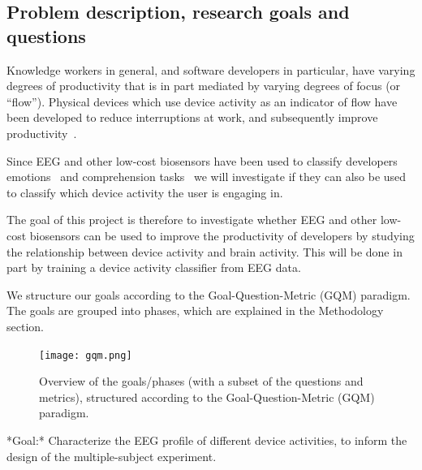 \documentclass{IEEEtran}
\begin{document}
\begin{refsection}


\section{Problem description, research goals and questions}



Knowledge workers in general, and software developers in particular, have varying degrees of productivity that is in part mediated by varying degrees of focus (or ``flow''). Physical devices which use device activity as an indicator of flow have been developed to reduce interruptions at work, and subsequently improve productivity~\cite{zuger_reducing_2017}.


Since EEG and other low-cost biosensors have been used to classify developers emotions~\cite{girardi_recognizing_2020} and comprehension tasks~\cite{fucci_replication_2019} we will investigate if they can also be used to classify which device activity the user is engaging in.

The goal of this project is therefore to investigate whether EEG and other low-cost biosensors can be used to improve the productivity of developers by studying the relationship between device activity and brain activity. This will be done in part by training a device activity classifier from EEG data. %

We structure our goals according to the Goal-Question-Metric (GQM) paradigm. The goals are grouped into phases, which are explained in the Methodology section.

\begin{figure}[h]
\centering
\texttt{[image: gqm.png]}
    \caption{Overview of the goals/phases (with a subset of the questions and metrics), structured according to the Goal-Question-Metric (GQM) paradigm.}\label{fig:gqm}
\end{figure}

\begin{markdown}
*Goal:* Characterize the EEG profile of different device activities, to inform the design of the multiple-subject experiment.


\end{markdown}
\end{refsection}
\end{document}
